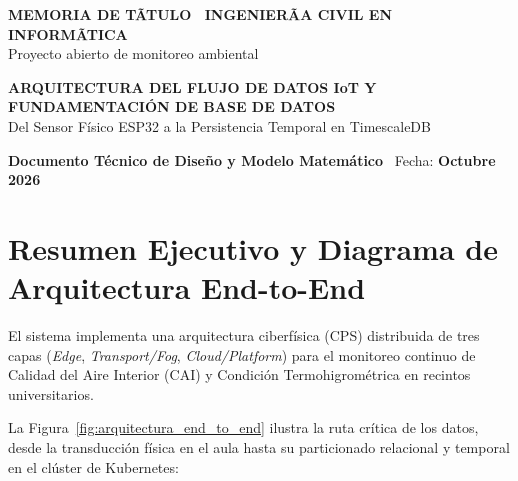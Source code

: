 \documentclass[11pt,a4paper]{article}
\begin{document}
\begin{center}
    {\color{primary}\Large\bfseries MEMORIA DE TÃTULO \textbar\ INGENIERÃA CIVIL EN INFORMÃTICA}\\[0.25cm]
    {\color{secondary}\large Proyecto abierto de monitoreo ambiental}\\[0.6cm]
    
    \begin{tcolorbox}[colback=primary, colframe=primary, arc=2mm, width=\linewidth, halign=center, top=5mm, bottom=5mm]
        {\color{white}\LARGE\bfseries ARQUITECTURA DEL FLUJO DE DATOS IoT Y FUNDAMENTACIÓN DE BASE DE DATOS}\\[0.3cm]
        {\color{white}\large Del Sensor Físico ESP32 a la Persistencia Temporal en TimescaleDB}
    \end{tcolorbox}
    \vspace{0.4cm}
    {\small\textbf{Documento Técnico de Diseño y Modelo Matemático} \textbar\ Fecha: \textbf{Octubre 2026}}
\end{center}

\vspace{0.3cm}

\section{Resumen Ejecutivo y Diagrama de Arquitectura End-to-End}

El sistema implementa una arquitectura ciberfísica (CPS) distribuida de tres capas (\textit{Edge}, \textit{Transport/Fog}, \textit{Cloud/Platform}) para el monitoreo continuo de Calidad del Aire Interior (CAI) y Condición Termohigrométrica en recintos universitarios. 

La Figura~\ref{fig:arquitectura_end_to_end} ilustra la ruta crítica de los datos, desde la transducción física en el aula hasta su particionado relacional y temporal en el clúster de Kubernetes:
\end{document}

